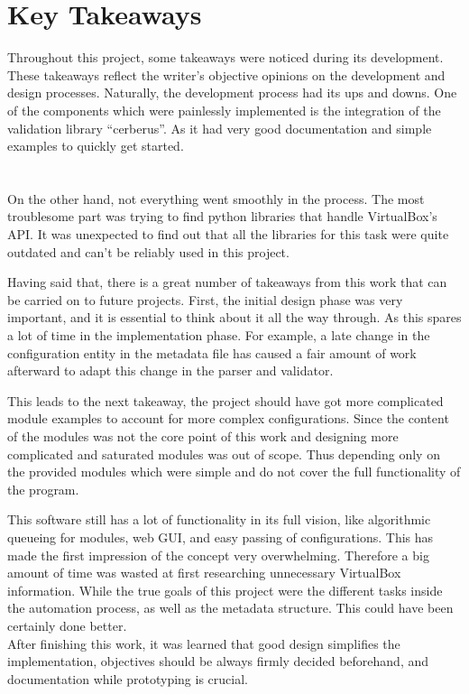 \section{Key Takeaways}
Throughout this project, some takeaways were noticed during its development. These takeaways reflect the writer’s objective opinions on the development and design processes.
Naturally, the development process had its ups and downs. One of the components which were painlessly implemented is the integration of the validation library “cerberus”. As it had very good documentation and simple examples to quickly get started.\\
\\
\\
On the other hand, not everything went smoothly in the process. The most troublesome part was trying to find python libraries that handle VirtualBox’s API. It was unexpected to find out that all the libraries for this task were quite outdated and can’t be reliably used in this project.

Having said that, there is a great number of takeaways from this work that can be carried on to future projects. First, the initial design phase was very important, and it is essential to think about it all the way through. As this spares a lot of time in the implementation phase. For example, a late change in the configuration entity in the metadata file has caused a fair amount of work afterward to adapt this change in the parser and validator.

This leads to the next takeaway, the project should have got more complicated module examples to account for more complex configurations. Since the content of the modules was not the core point of this work and designing more complicated and saturated modules was out of scope. Thus depending only on the provided modules which were simple and do not cover the full functionality of the program.

This software still has a lot of functionality in its full vision, like algorithmic queueing for modules, web GUI, and easy passing of configurations. This has made the first impression of the concept very overwhelming. Therefore a big amount of time was wasted at first researching unnecessary VirtualBox information. While the true goals of this project were the different tasks inside the automation process, as well as the metadata structure. This could have been certainly done better.\\
After finishing this work, it was learned that good design simplifies the implementation, objectives should be always firmly decided beforehand, and documentation while prototyping is crucial.
